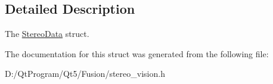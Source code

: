 \subsection{Detailed Description}
The \hyperlink{structstereo__vision_1_1_stereo_data}{Stereo\+Data} struct. 

The documentation for this struct was generated from the following file\+:\begin{DoxyCompactItemize}
\item 
D\+:/\+Qt\+Program/\+Qt5/\+Fusion/stereo\+\_\+vision.\+h\end{DoxyCompactItemize}

